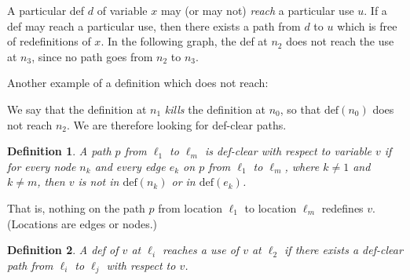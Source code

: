 \documentclass[11pt]{article}
\newtheorem{defn}{Definition}
\begin{document}
A particular def $d$ of variable $x$ may (or may not) \emph{reach} a
particular use $u$.  If a def may reach a particular use, then there
exists a path from $d$ to $u$ which is free of redefinitions of $x$.
In the following graph, the def at $n_2$ does not reach the use at $n_3$,
since no path goes from $n_2$ to $n_3$.

\begin{center}
\end{center}
Another example of a definition which does not reach:
\begin{center}
\end{center}
We say that the definition at $n_1$ \emph{kills} the definition at
$n_0$, so that $\mbox{def}(n_0)$ does not reach $n_2$. We are therefore
looking for def-clear paths.

\begin{defn}
A path $p$ from $\ell_1$ to $\ell_m$ is \emph{def-clear} with respect
to variable $v$ if for every node $n_k$ and every edge $e_k$ on $p$
from $\ell_1$ to $\ell_m$, where $k \neq 1$ and $k \neq m$, then $v$
is not in $\mbox{def}(n_k)$ or in $\mbox{def}(e_k)$.
\end{defn}
That is, nothing on the path $p$ from location $\ell_1$ to location
$\ell_m$ redefines $v$. (Locations are edges or nodes.)
\begin{defn} 
A def of $v$ at $\ell_i$ reaches a use of $v$ at $\ell_2$ if there
exists a def-clear path from $\ell_i$ to $\ell_j$ with respect to $v$.
\end{defn}
\end{document}
